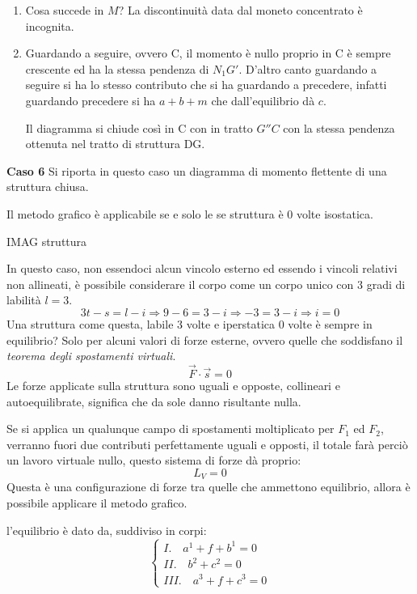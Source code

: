 \documentclass{article}
\begin{document}
\begin{adjustwidth}{2in}{}
\begin{enumerate}
		\item Cosa succede in $M$? La discontinuità data dal moneto concentrato è incognita. 
		
		\item Guardando a seguire, ovvero C, il momento è nullo proprio in C è sempre crescente ed ha la stessa pendenza di $N_1G'$. 
		D'altro canto guardando a seguire si ha lo stesso contributo che si ha guardando a precedere, infatti guardando  precedere si ha $a+b+m$ che dall'equilibrio dà $c$. 
		
		Il diagramma si chiude così in C con in tratto $G''C$ con la stessa pendenza ottenuta nel tratto di struttura DG.
	\end{enumerate}

\textbf{Caso 6}\newline 
	Si riporta in questo caso un diagramma di momento flettente di una struttura chiusa. 
	
	Il metodo grafico è applicabile se e solo le se struttura è 0 volte isostatica. 
	
	IMAG struttura
	
	In questo caso, non essendoci alcun vincolo esterno ed essendo i vincoli relativi non allineati, è possibile considerare il corpo come un corpo unico con 3 gradi di labilità $l=3$. 
	\[3t-s=l-i\Rightarrow 9 - 6 = 3-i \Rightarrow -3 = 3-i \Rightarrow i=0\]
	Una struttura come questa, labile 3 volte e iperstatica 0 volte è sempre in equilibrio? Solo per alcuni valori di forze esterne, ovvero quelle che soddisfano il \textit{teorema degli spostamenti virtuali}.
	\[\vec{F}\cdot\vec{s} = 0\]
	Le forze applicate sulla struttura sono uguali e opposte, collineari e autoequilibrate, significa che da sole danno risultante nulla. 
	
	Se si applica un qualunque campo di spostamenti moltiplicato per $F_1$ ed $F_2$, verranno fuori due contributi perfettamente uguali e opposti, il totale farà perciò un lavoro virtuale nullo, questo sistema di forze dà proprio:
	\[L_V=0\]
	Questa è una configurazione di forze tra quelle che ammettono equilibrio, allora è possibile applicare il metodo grafico. \newline 
	
	l'equilibrio è dato da, suddiviso in corpi:
	\[\begin{cases}
		I.\quad a^1 +f + b^1 = 0\\
		II.\quad b^2+c^2 = 0 \\
		III.\quad a^3+f+c^3 = 0
	\end{cases}\]
	

\end{adjustwidth}
\end{document}
